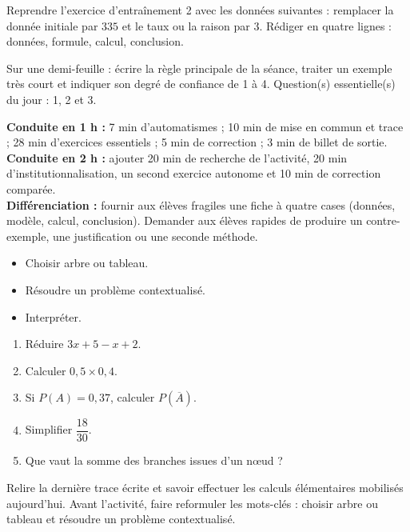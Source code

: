     \begin{dm}Reprendre l'exercice d'entraînement 2 avec les données suivantes : remplacer la donnée initiale par $335$ et le taux ou la raison par $3$. Rédiger en quatre lignes : données, formule, calcul, conclusion.\end{dm}

    \begin{sortie}Sur une demi-feuille : écrire la règle principale de la séance, traiter un exemple très court et indiquer son degré de confiance de 1 à 4. Question(s) essentielle(s) du jour : 1, 2 et 3.\end{sortie}

    \ifprof
    \begin{methode}
    \textbf{Conduite en 1 h :} 7 min d'automatismes ; 10 min de mise en commun et trace ; 28 min d'exercices essentiels ; 5 min de correction ; 3 min de billet de sortie.\\
    \textbf{Conduite en 2 h :} ajouter 20 min de recherche de l'activité, 20 min d'institutionnalisation, un second exercice autonome et 10 min de correction comparée.\\
    \textbf{Différenciation :} fournir aux élèves fragiles une fiche à quatre cases (données, modèle, calcul, conclusion). Demander aux élèves rapides de produire un contre-exemple, une justification ou une seconde méthode.
    \end{methode}
    \fi
{}
\begin{objectifs}\begin{itemize}\item Choisir arbre ou tableau.\item Résoudre un problème contextualisé.\item Interpréter.\end{itemize}\end{objectifs}
\begin{automatismes}\begin{enumerate}\item Réduire $3x+5-x+2$. \item Calculer $0{,}5\times0{,}4$. \item Si $P(A)=0{,}37$, calculer $P(\overline A)$. \item Simplifier $\dfrac{18}{30}$. \item Que vaut la somme des branches issues d'un nœud ? \end{enumerate}\end{automatismes}
\begin{prerequis}Relire la dernière trace écrite et savoir effectuer les calculs élémentaires mobilisés aujourd'hui. Avant l'activité, faire reformuler les mots-clés : choisir arbre ou tableau et résoudre un problème contextualisé.\end{prerequis}

